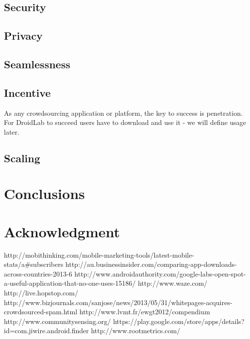 \documentclass[conference,letterpaper]{IEEEtran}
\begin{document}
\subsection{Security}
\subsection{Privacy}
\subsection{Seamlessness}
\subsection{Incentive}
As any crowdsourcing application or platform, the key to success is penetration. For DroidLab to succeed users have to download and use it - we will define usage later. 
\subsection{Scaling}
\label{sec:solutions}
\section{Conclusions}
\label{sec:conclusion_and_future_work}
\section{Acknowledgment}
\label{sec:acknowledgment}
http://mobithinking.com/mobile-marketing-tools/latest-mobile-stats/a\#subscribers
http://au.businessinsider.com/comparing-app-downloads-across-countries-2013-6
http://www.androidauthority.com/google-labs-open-spot-a-useful-application-that-no-one-uses-15186/
http://www.waze.com/
http://live.hopstop.com/
http://www.bizjournals.com/sanjose/news/2013/05/31/whitepages-acquires-crowdsourced-spam.html
http://www.lvmt.fr/ewgt2012/compendium
http://www.communitysensing.org/
https://play.google.com/store/apps/details?id=com.jiwire.android.finder
http://www.rootmetrics.com/
\end{document}
